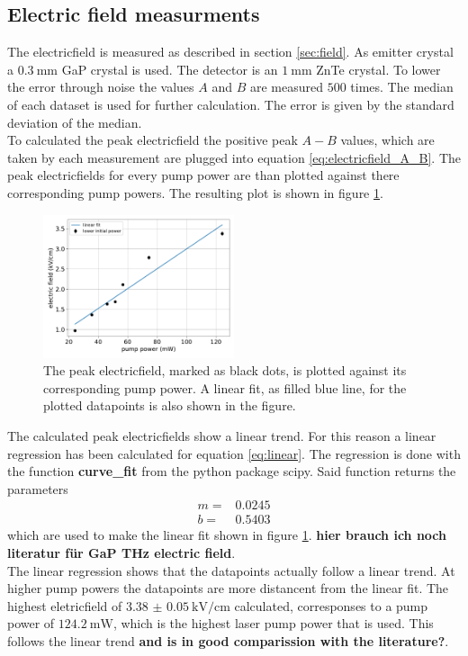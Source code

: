 \FloatBarrier
\subsection{Electric field measurments}
\FloatBarrier
The electricfield is measured as described in section \ref{sec:field}.
As emitter crystal a $\SI{0.3}{\milli\meter}$ GaP crystal is used.
The detector is an $\SI{1}{\milli\meter}$ ZnTe crystal.
To lower the error through noise the values $A$ and $B$ are measured $500$ times.
The median of each dataset is used for further calculation.
The error is given by the standard deviation of the median.
\\
To calculated the peak electricfield the positive peak $A-B$ values, which are taken by each measurement are plugged into equation \ref{eq:electricfield_A_B}.
The peak electricfields for every pump power are than plotted against there corresponding pump powers.
The resulting plot is shown in figure \ref{fig:gap_electricfield}.
\begin{figure}
    \centering
    \includegraphics[width=0.5\textwidth]{Plots/eltric_field_GaP.pdf}
    \caption{The peak electricfield, marked as black dots, is plotted against its corresponding pump power.
    A linear fit, as filled blue line, for the plotted datapoints is also shown in the figure.}
    \label{fig:gap_electricfield}
\end{figure}
The calculated peak electricfields show a linear trend.
For this reason a linear regression has been calculated for equation \ref{eq:linear}.
The regression is done with the function \textbf{curve\_fit} from the python package scipy.
Said function returns the parameters
\begin{align*} 
    m =& 0.0245\\
    b =& 0.5403
\end{align*}
which are used to make the linear fit shown in figure \ref{fig:gap_electricfield}.
\textbf{hier brauch ich noch literatur für GaP THz electric field}.
\\
The linear regression shows that the datapoints actually follow a linear trend.
At higher pump powers the datapoints are more distancent from the linear fit.
The highest eletricfield of $\SI{3.38(5)}{\kilo\V\per\centi\meter}$ calculated, corresponses to a pump power of $\SI{124.2}{\milli\W}$, which is the highest laser pump power that is used.
This follows the linear trend \textbf{and is in good comparission with the literature?}.

